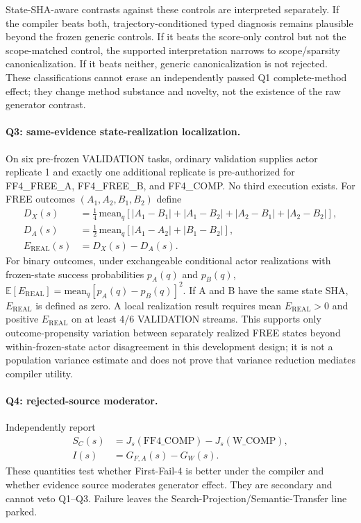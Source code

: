 State-SHA-aware contrasts against these controls are interpreted separately. If the compiler beats both, trajectory-conditioned typed diagnosis remains plausible beyond the frozen generic controls. If it beats the score-only control but not the scope-matched control, the supported interpretation narrows to scope/sparsity canonicalization. If it beats neither, generic canonicalization is not rejected. These classifications cannot erase an independently passed Q1 complete-method effect; they change method substance and novelty, not the existence of the raw generator contrast.

\paragraph{Q3: same-evidence state-realization localization.}
On six pre-frozen VALIDATION tasks, ordinary validation supplies actor replicate 1 and exactly one additional replicate is pre-authorized for FF4\_FREE\_A, FF4\_FREE\_B, and FF4\_COMP. No third execution exists. For FREE outcomes $(A_1,A_2,B_1,B_2)$ define
\begin{align}
D_X(s) &= \tfrac{1}{4}\,\mathrm{mean}_q\left[|A_1-B_1|+|A_1-B_2|+|A_2-B_1|+|A_2-B_2|\right],\\
D_A(s) &= \tfrac{1}{2}\,\mathrm{mean}_q\left[|A_1-A_2|+|B_1-B_2|\right],\\
E_{\mathrm{REAL}}(s) &= D_X(s)-D_A(s).
\end{align}
For binary outcomes, under exchangeable conditional actor realizations with frozen-state success probabilities $p_A(q)$ and $p_B(q)$, $\mathbb{E}[E_{\mathrm{REAL}}]=\mathrm{mean}_q[p_A(q)-p_B(q)]^2$. If A and B have the same state SHA, $E_{\mathrm{REAL}}$ is defined as zero. A local realization result requires mean $E_{\mathrm{REAL}}>0$ and positive $E_{\mathrm{REAL}}$ on at least 4/6 VALIDATION streams. This supports only outcome-propensity variation between separately realized FREE states beyond within-frozen-state actor disagreement in this development design; it is not a population variance estimate and does not prove that variance reduction mediates compiler utility.

\paragraph{Q4: rejected-source moderator.}
Independently report
\begin{align}
S_C(s) &= J_s(\text{FF4\_COMP})-J_s(\text{W\_COMP}),\\
I(s) &= G_{F,A}(s)-G_W(s).
\end{align}
These quantities test whether First-Fail-4 is better under the compiler and whether evidence source moderates generator effect. They are secondary and cannot veto Q1--Q3. Failure leaves the Search-Projection/Semantic-Transfer line parked.

